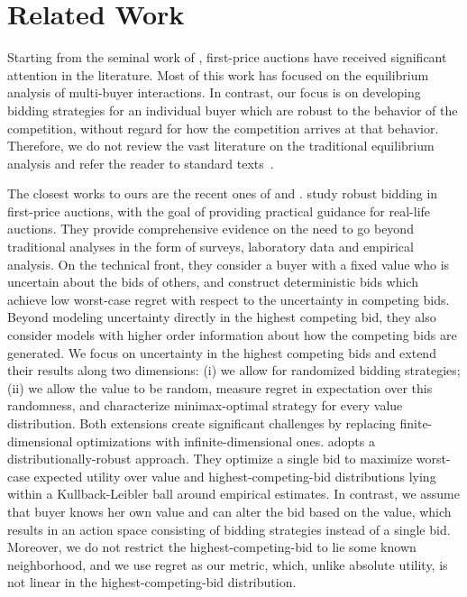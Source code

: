 \section{Related Work}
Starting from the seminal work of \citet{vickrey1961counterspeculation}, first-price auctions have received significant attention in the literature. Most of this work has focused on the equilibrium analysis of multi-buyer interactions. In contrast, our focus is on developing bidding strategies for an individual buyer which are robust to the behavior of the competition, without regard for how the competition arrives at that behavior. Therefore, we do not review the vast literature on the traditional equilibrium analysis and refer the reader to standard texts~\citep{krishna2009auction, milgrom2004putting}.

The closest works to ours are the recent ones of \citet{kasberger2023robust} and \citet{qu2024double}. \citet{kasberger2023robust} study robust bidding in first-price auctions, with the goal of providing practical guidance for real-life auctions. They provide comprehensive evidence on the need to go beyond traditional analyses in the form of surveys, laboratory data and empirical analysis. On the technical front, they consider a buyer with a fixed value who is uncertain about the bids of others, and construct deterministic bids which achieve low worst-case regret with respect to the uncertainty in competing bids. Beyond modeling uncertainty directly in the highest competing bid, they also consider models with higher order information about how the competing bids are generated. We focus on uncertainty in the highest competing bids and extend their results along two dimensions: (i) we allow for randomized bidding strategies; (ii) we allow the value to be random, measure regret in expectation over this randomness, and characterize minimax-optimal strategy for every value distribution. Both extensions create significant challenges by replacing finite-dimensional optimizations with infinite-dimensional ones. \citet{qu2024double} adopts a distributionally-robust approach. They optimize a single bid to maximize worst-case expected utility over value and highest-competing-bid distributions lying within a Kullback-Leibler ball around empirical estimates. In contrast, we assume that buyer knows her own value and can alter the bid based on the value, which results in an action space consisting of bidding strategies instead of a single bid. Moreover, we do not restrict the highest-competing-bid to lie some known neighborhood, and we use regret as our metric, which, unlike absolute utility, is not linear in the highest-competing-bid distribution.

